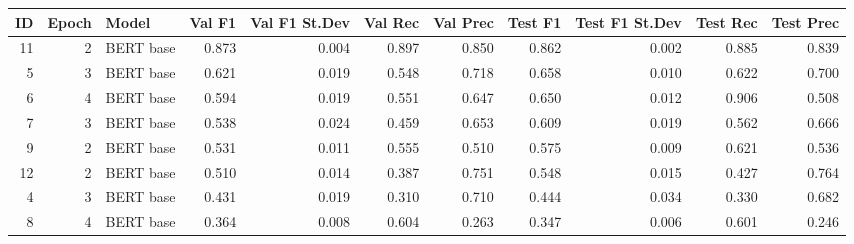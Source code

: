 \begin{tabular}{rrlrrrrrrrr}
\toprule
 ID &  Epoch &     Model &  Val F1 &  Val F1 St.Dev &  Val Rec &  Val Prec &  Test F1 &  Test F1 St.Dev &  Test Rec &  Test Prec \\
\midrule
 11 &      2 & BERT base &   0.873 &          0.004 &    0.897 &     0.850 &    0.862 &           0.002 &     0.885 &      0.839 \\
  5 &      3 & BERT base &   0.621 &          0.019 &    0.548 &     0.718 &    0.658 &           0.010 &     0.622 &      0.700 \\
  6 &      4 & BERT base &   0.594 &          0.019 &    0.551 &     0.647 &    0.650 &           0.012 &     0.906 &      0.508 \\
  7 &      3 & BERT base &   0.538 &          0.024 &    0.459 &     0.653 &    0.609 &           0.019 &     0.562 &      0.666 \\
  9 &      2 & BERT base &   0.531 &          0.011 &    0.555 &     0.510 &    0.575 &           0.009 &     0.621 &      0.536 \\
 12 &      2 & BERT base &   0.510 &          0.014 &    0.387 &     0.751 &    0.548 &           0.015 &     0.427 &      0.764 \\
  4 &      3 & BERT base &   0.431 &          0.019 &    0.310 &     0.710 &    0.444 &           0.034 &     0.330 &      0.682 \\
  8 &      4 & BERT base &   0.364 &          0.008 &    0.604 &     0.263 &    0.347 &           0.006 &     0.601 &      0.246 \\
\hline
\end{tabular}
